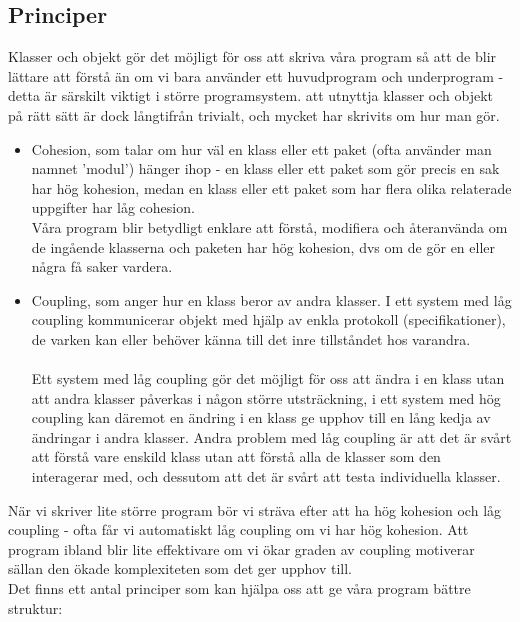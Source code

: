 \documentclass[11pt]{article}
\begin{document}
\subsection{Principer}
Klasser och objekt gör det möjligt för oss att skriva våra program så att de blir lättare att förstå än om vi bara använder ett huvudprogram och underprogram - detta är särskilt viktigt i större programsystem. att utnyttja klasser och objekt på rätt sätt är dock långtifrån trivialt, och mycket har skrivits om hur man gör.
\begin{itemize}
\item{Cohesion, som talar om hur väl en klass eller ett paket (ofta använder man namnet 'modul') hänger ihop - en klass eller ett paket som gör precis en sak har hög kohesion, medan en klass eller ett paket som har flera olika relaterade uppgifter har låg cohesion. \\
Våra program blir betydligt enklare att förstå, modifiera och återanvända om de ingående klasserna och paketen har hög kohesion, dvs om de gör en eller några få saker vardera.}

\item{Coupling, som anger hur en klass beror av andra klasser. I ett system med låg coupling kommunicerar objekt med hjälp av enkla protokoll (specifikationer), de varken kan eller behöver känna till det inre tillståndet hos varandra. \\ \\
Ett system med låg coupling gör det möjligt för oss att ändra i en klass utan att andra klasser påverkas i någon större utsträckning, i ett system med hög coupling kan däremot en ändring i en klass ge upphov till en lång kedja av ändringar i andra klasser. Andra problem med låg coupling är att det är svårt att förstå vare enskild klass utan att förstå alla de klasser som den interagerar med, och dessutom att det är svårt att testa individuella klasser. }
\end{itemize}
När vi skriver lite större program bör vi sträva efter att ha hög kohesion och låg coupling - ofta får vi automatiskt låg coupling om vi har hög kohesion. Att program ibland blir lite effektivare om vi ökar graden av coupling motiverar sällan den ökade komplexiteten som det ger upphov till. \\
Det finns ett antal principer som kan hjälpa oss att ge våra program bättre struktur:
\end{document}
